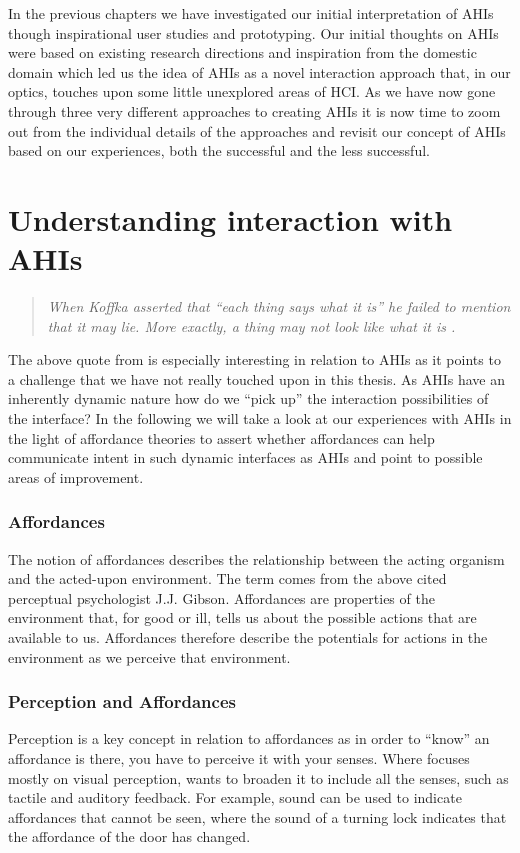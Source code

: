 In the previous chapters we have investigated our initial interpretation of AHIs though inspirational user studies and prototyping.
Our initial thoughts on AHIs were based on existing research directions and inspiration from the domestic domain which led us the idea of AHIs as a novel interaction approach that, in our optics, touches upon some little unexplored areas of HCI.  
As we have now gone through three very different approaches to creating AHIs it is now time to zoom out from the individual details of the approaches and revisit our concept of AHIs based on our experiences, both the successful and the less successful.


\section{Understanding interaction with AHIs}
\begin{quotation}
\emph{When Koffka asserted that ``each thing says what it is'' he failed to mention that it may lie. More exactly, a thing may not look like what it is \citep{gibson1979ecological}.}
\end{quotation}
The above quote from \citeauthor{gibson1979ecological} is especially interesting in relation to AHIs as it points to a challenge that we have not really touched upon in this thesis.
As AHIs have an inherently dynamic nature how do we ``pick up'' the interaction possibilities of the interface? 
In the following we will take a look at our experiences with AHIs in the light of affordance theories to assert whether affordances can help communicate intent in such dynamic interfaces as AHIs and point to possible areas of improvement.

\subsubsection{Affordances}
The notion of affordances describes the relationship between the acting organism and the acted-upon environment.
The term comes from the above cited perceptual psychologist J.J. Gibson.
Affordances are properties of the environment that, for good or ill, tells us about the possible actions that are available to us.
Affordances therefore describe the potentials for actions in the environment as we perceive that environment.  

\subsubsection{Perception and Affordances}
Perception is a key concept in relation to affordances as in order to ``know'' an affordance is there, you have to perceive it with your senses. Where \citet{gibson1979ecological} focuses mostly on visual perception, \citet{gaver1991technology} wants to broaden it to include all the senses, such as tactile and auditory feedback.
For example, sound can be used to indicate affordances that cannot be seen, where the sound of a turning lock indicates that the affordance of the door has changed.

